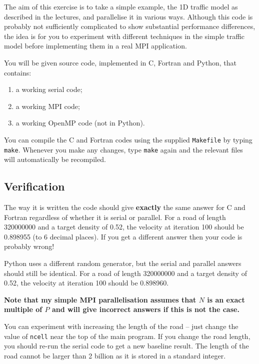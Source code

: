 \documentclass{article}
\begin{document}
The aim of this exercise is to take a simple example, the 1D traffic
model as described in the lectures, and parallelise it in various
ways. Although this code is probably not sufficiently complicated to
show substantial performance differences, the idea is for you to
experiment with different techniques in the simple traffic model
before implementing them in a real MPI application.

You will be given source code, implemented in C, Fortran and Python, that
contains:

\begin{enumerate}

\item a working serial code;

\item a working MPI code;

\item a working OpenMP code (not in Python).

\end{enumerate}

You can compile the C and Fortran codes using the supplied
\texttt{Makefile} by typing \texttt{make}. Whenever you make any
changes, type \texttt{make} again and the relevant files will
automatically be recompiled.

\subsection{Verification}

The way it is written the code should give {\bf exactly} the same
answer for C and Fortran regardless of whether it is serial or
parallel. For a road of length 320000000 and a target density of 0.52,
the velocity at iteration 100 should be 0.898955 (to 6 decimal
places). If you get a different answer then your code is probably
wrong!

Python uses a different random generator, but the serial and parallel
answers should still be identical. For a road of length 320000000 and
a target density of 0.52, the velocity at iteration 100 should be
0.898960.

{\bf Note that my simple MPI parallelisation assumes that $N$ is an exact
multiple of $P$ and will give incorrect answers if this is not the
case.}

You can experiment with increasing the length of the road -- just
change the value of {\verb+ncell+} near the top of the main program.
If you change the road length, you should re-run the serial code to get a
new baseline result. The length of the road cannot be larger than 2
billion as it is stored in a standard integer.
\end{document}
